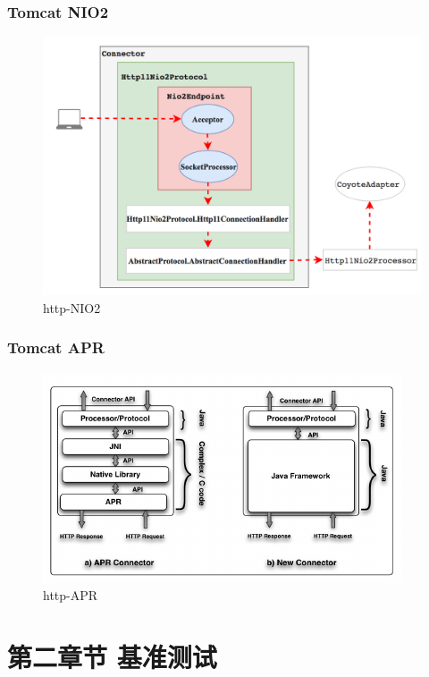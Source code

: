 \documentclass{beamer}
\begin{document}
\begin{frame}
\frametitle{Tomcat NIO2}
\begin{figure}[ht]
	
	\centering
	\includegraphics[scale=0.45]{img/http-NIO2.png}
	\caption{http-NIO2}
	\label{fig:pathdemo1}
\end{figure}

\end{frame}

\begin{frame}
\frametitle{Tomcat APR}
\begin{figure}[ht]
	
	\centering
	\includegraphics[scale=0.45]{img/JBoss-Web-Connector-Architecture.png}
	\caption{http-APR}
	\label{fig:pathdemo1}
\end{figure}

\end{frame}

\section{第二章节 基准测试}
\end{document}
